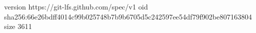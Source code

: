 version https://git-lfs.github.com/spec/v1
oid sha256:66e26bdff4014c99b025748b7b9b6705d5c242597ee54df79f902be807163804
size 3611

